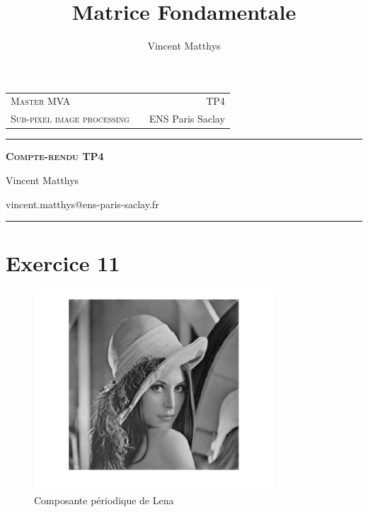 \documentclass[12pt,a4paper,onecolumn]{article}
\title{Matrice Fondamentale}
\author{Vincent Matthys}
\begin{document}
\begin{tabularx}{0.9\textwidth}{@{} l X r @{} }
	{\textsc{Master MVA}}               &  & \textsc{TP4}       \\
	\textsc{Sub-pixel image processing} &  & {ENS Paris Saclay} \\
\end{tabularx}
\vspace{1.5cm}
\begin{center}

	\rule[11pt]{5cm}{0.5pt}

	\textbf{\LARGE \textsc{Compte-rendu TP4}}
	\vspace{0.5cm}

	Vincent Matthys

	vincent.matthys@ens-paris-saclay.fr

	\rule{5cm}{0.5pt}

	\vspace{1.5cm}
\end{center}

\section{Exercice 11}


\begin{figure}[H]
	\centering
	\includegraphics[width = 0.8\textwidth]{per}
	\caption{Composante périodique de Lena}
	\label{fig_11_per}
\end{figure}
\end{document}
